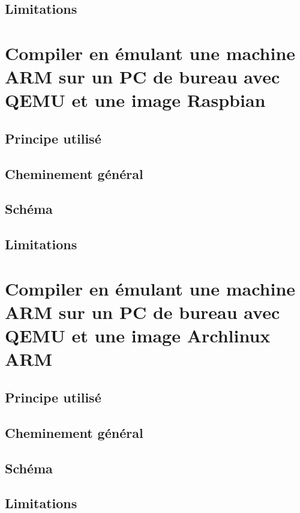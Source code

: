 \documentclass[11pt,a4paper,oneside]{article}
\begin{document}
\subsection{Limitations}




\section{Compiler en émulant une machine ARM sur un PC de bureau avec QEMU et une image Raspbian}

\subsection{Principe utilisé}

\subsection{Cheminement général}

\subsection{Schéma}

\subsection{Limitations}



\section{Compiler en émulant une machine ARM sur un PC de bureau avec QEMU et une image Archlinux ARM}

\subsection{Principe utilisé}

\subsection{Cheminement général}

\subsection{Schéma}

\subsection{Limitations}
\end{document}
